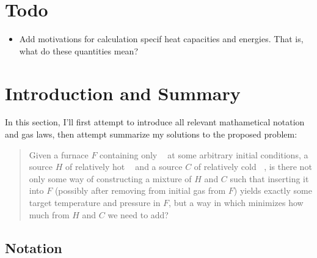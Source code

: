 \documentclass{article}
\DeclareMathOperator{\CDiox}{\mathrm{CO}_2}
\begin{document}
\section*{Todo}
\begin{itemize}
    \item Add motivations for calculation specif heat capacities and energies.
        That is, what do these quantities mean?
\end{itemize}

\section{Introduction and Summary}
In this section, I'll first attempt to introduce all relevant mathametical notation and gas laws,
then attempt summarize my solutions to the proposed problem:

\begin{quote}
    \begin{itshape}
        Given a furnace $F$ containing only $\CDiox$ at some arbitrary initial conditions, a source
        $H$ of relatively hot $\CDiox$ and a source $C$ of relatively cold $\CDiox$, is there not
        only some way of constructing a mixture of $H$ and $C$ such that inserting it into $F$
        (possibly after removing from initial gas from $F$) yields exactly some target temperature
        and pressure in $F$, but a way in which minimizes how much from $H$ and $C$ we need to add?
    \end{itshape}
\end{quote}

\subsection{Notation}
\end{document}
